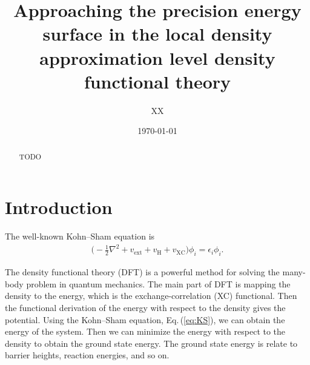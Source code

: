 \documentclass[%
twocolumn,
amsmath,amssymb,
groupedaddress,
reprint,%
]{revtex4-2}
\renewcommand{\>}{\rangle}
\newcommand{\<}{\langle}
\newcommand{\eq}[1]{Eq.\,(\ref{#1})}
\begin{document}
\title{
	Approaching the precision energy surface in the local density approximation level density functional theory
}
\author{XX}

\date{\today}

\begin{abstract}
	{
		TODO
	}
\end{abstract}

\maketitle

\allowdisplaybreaks

\section{Introduction}
The well-known Kohn--Sham equation \cite{Koh65A1133} is
\begin{align}
	\label{eq:KS}
	\Big( - \frac{1}{2} \nabla^{2} + v_{\mathrm{ext}} + v_{\mathrm{H}} + v_{\mathrm{XC}}\Big) \phi_{i} = \epsilon_{i} \phi_{i}.
\end{align}

The density functional theory (DFT) is a powerful method for solving the many-body problem in quantum mechanics.
% 
The main part of DFT is mapping the density to the energy, which is the exchange-correlation (XC) functional.
% 
Then the functional derivation of the energy with respect to the density gives the potential.
% 
Using the Kohn--Sham equation, \eq{eq:KS}, we can obtain the energy of the system.
% 
Then we can minimize the energy with respect to the density to obtain the ground state energy.
% 
The ground state energy is relate to barrier heights, reaction energies, and so on.
\end{document}
